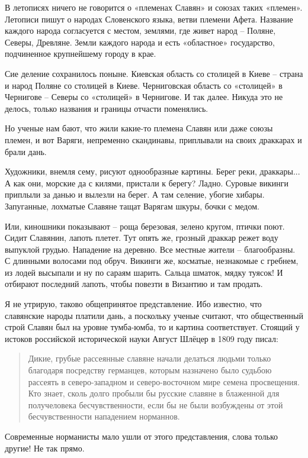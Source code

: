 В летописях ничего не говорится о «племенах Славян» и союзах таких «племен». Летописи пишут о народах Словенского языка, ветви племени Афета. Название каждого народа согласуется с местом, землями, где живет народ – Поляне, Северы, Древляне. Земли каждого народа и есть «областное» государство, подчиненное крупнейшему городу в крае. 

Сие деление сохранилось поныне. Киевская область со столицей в Киеве – страна и народ Поляне со столицей в Киеве. Черниговская область со «столицей» в Чернигове – Северы со «столицей» в Чернигове. И так далее. Никуда это не делось, только названия и границы отчасти поменялись.

Но ученые нам бают, что жили какие-то племена Славян или даже союзы племен, и вот Варяги, непременно скандинавы, приплывали на своих драккарах и брали дань. 

Художники, внемля сему, рисуют однообразные картины. Берег реки, драккары... А как они, морские да с килями, пристали к берегу? Ладно. Суровые викинги приплыли за данью и вылезли на берег. А там селение, убогие хибары. Запуганные, лохматые Славяне тащат Варягам шкуры, бочки с медом. 

Или, киношники показывают – роща березовая, зелено кругом, птички поют. Сидит Славянин, лапоть плетет. Тут опять же, грозный драккар режет воду выпуклой грудью. Нападение на деревню. Все местные жители – благообразны. С длинными волосами под обруч. Викинги же, косматые, незнакомые с гребнем, из лодей высыпали и ну по сараям шарить. Сальца шматок, мядку туясок! И отбирают последний лапоть, чтобы повезти в Византию и там продать.

Я не утрирую, таково общепринятое представление. Ибо известно, что славянские народы платили дань, а поскольку ученые считают, что общественный строй Славян был на уровне тумба-юмба, то и картина соответствует. Стоящий у истоков российской исторической науки Август Шлёцер в 1809 году писал:

\begin{quotation}
Дикие, грубые рассеянные славяне начали делаться людьми только благодаря посредству германцев, которым назначено было судьбою рассеять в северо-западном и северо-восточном мире семена просвещения. Кто знает, сколь долго пробыли бы русские славяне в блаженной для получеловека бесчувственности, если бы не были возбуждены от этой бесчувственности нападением норманнов.
\end{quotation}

Современные норманисты мало ушли от этого представления, слова только другие! Не так прямо.

